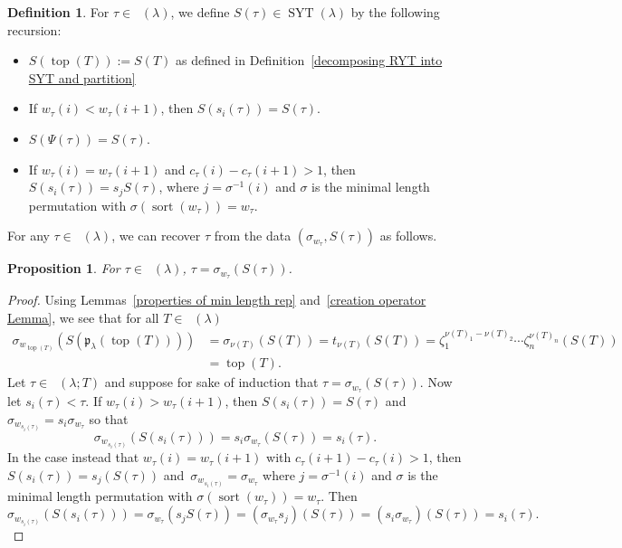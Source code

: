 \documentclass[pdftex]{sigma}
\numberwithin{equation}{section}
\newtheorem{Proposition}[Theorem]{Proposition}
\theoremstyle{definition}
\newtheorem{Definition}[Theorem]{Definition}
\DeclareMathOperator{\RYT}{\mathrm{RYT}_{\geq 0}}
\DeclareMathOperator{\SYT}{\mathrm{SYT}}
\DeclareMathOperator{\PSYT}{\mathrm{PSYT}_{\geq 0}}
\DeclareMathOperator{\sort}{sort}
\DeclareMathOperator{\Top}{\mathrm{top}}
\begin{document}
\begin{Definition}\label{tableaux from PSYT def}
 For $\tau \in \PSYT(\lambda)$, we define $S(\tau) \in \SYT(\lambda)$ by the following recursion:
 \begin{itemize}\itemsep=0pt
 \item $S(\Top(T)) := S(T)$ as defined in Definition~\ref{decomposing RYT into SYT and partition}
 \item If $w_{\tau}(i) < w_{\tau}(i+1)$, then $S(s_i(\tau))= S(\tau)$.
 \item $S(\Psi(\tau)) = S(\tau)$.
 \item If $w_{\tau}(i) = w_{\tau}(i+1)$ and $c_{\tau}(i) - c_{\tau}(i+1)>1$, then $S(s_i(\tau))= s_jS(\tau)$, where $j = \sigma^{-1}(i)$ and $\sigma$ is the minimal length permutation with $\sigma(\sort(w_{\tau})) = w_{\tau}$.
 \end{itemize}
\end{Definition}

For any $\tau \in \PSYT(\lambda)$, we can recover $\tau$ from the data $(\sigma_{w_{\tau}}, S(\tau))$ as follows.

\begin{Proposition}\label{generating PSYT from SYT}
 For $\tau \in \PSYT(\lambda)$,
 $\tau = \sigma_{w_{\tau}}(S(\tau))$.
\end{Proposition}
\begin{proof}
 Using Lemmas~\ref{properties of min length rep} and~\ref{creation operator Lemma}, we see that for all $T \in \RYT(\lambda)$
 \begin{align*}
 \sigma_{w_{\Top(T)}}(S(\mathfrak{p}_{\lambda}(\Top(T))))& = \sigma_{\nu(T)}(S(T)) = t_{\nu(T)}(S(T)) = \zeta_1^{\nu(T)_1 - \nu(T)_2}\cdots \zeta_n^{\nu(T)_{n}}(S(T)) \\
 &= \Top(T).
 \end{align*}
 Let $\tau \in \PSYT(\lambda;T)$ and suppose for sake of induction that $\tau = \sigma_{w_{\tau}}(S(\tau))$. Now let $s_i(\tau) < \tau$. If $w_{\tau}(i) > w_{\tau}(i+1)$, then $S(s_i(\tau)) = S(\tau)$ and $\sigma_{w_{s_i(\tau)}}= s_i\sigma_{w_{\tau}}$ so that
 \[
 \sigma_{w_{s_i(\tau)}}(S(s_i(\tau))) = s_i\sigma_{w_{\tau}}(S(\tau)) = s_i(\tau).
 \]
 In the case instead that $w_{\tau}(i) = w_{\tau}(i+1)$ with $c_{\tau}(i+1)-c_{\tau}(i) > 1$, then $S(s_i(\tau)) = s_j(S(\tau))$ and~${\sigma_{w_{s_i(\tau)}} = \sigma_{w_{\tau}}}$ where $j = \sigma^{-1}(i)$ and $\sigma$ is the minimal length permutation with $\sigma(\sort(w_{\tau})) = w_{\tau}$.
 Then
 \[
 \sigma_{w_{s_i(\tau)}}(S(s_i(\tau)))=\sigma_{w_{\tau}}(s_jS(\tau))= (\sigma_{w_{\tau}}s_j)(S(\tau))= (s_i\sigma_{w_{\tau}})(S(\tau))= s_i(\tau).\tag*{\qed}
 \] \renewcommand{\qed}{}
\end{proof}
\end{document}
